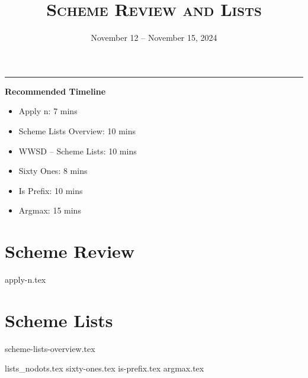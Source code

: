 \documentclass{exam}
\title{\textsc{Scheme Review and Lists}}
\date{November 12 -- November 15, 2024}
\begin{document}
\maketitle
\rule{\textwidth}{0.15em}

\begin{meta} %
    \begin{blocksection}
        \textbf{Recommended Timeline}
        \begin{itemize}
            \item Apply n: 7 mins
            \item Scheme Lists Overview: 10 mins
            \item WWSD -- Scheme Lists: 10 mins
            \item Sixty Ones: 8 mins
            \item Is Prefix: 10 mins
            \item Argmax: 15 mins
        \end{itemize}
    \end{blocksection}
\end{meta}

\section{Scheme Review}
\begin{questions}
    {apply-n.tex}
\end{questions}

\section{Scheme Lists}
{scheme-lists-overview.tex}
\newpage
\begin{questions}
{lists_nodots.tex}
{sixty-ones.tex}
{is-prefix.tex}
\newpage
{argmax.tex} 
\end{questions}
\end{document}
